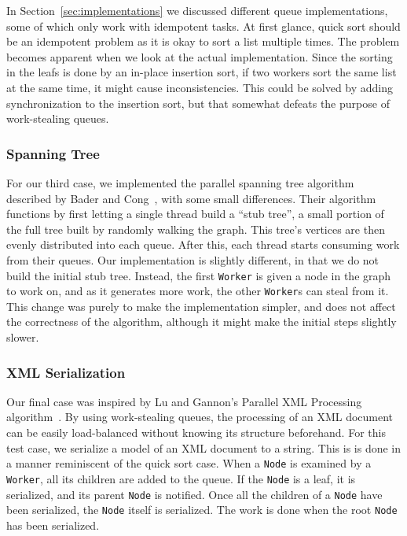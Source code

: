 In Section~\ref{sec:implementations} we discussed different queue implementations, some of which only work with idempotent tasks. At first glance, quick sort should be an idempotent problem as it is okay to sort a list multiple times. The problem becomes apparent when we look at the actual implementation. Since the sorting in the leafs is done by an in-place insertion sort, if two workers sort the same list at the same time, it might cause inconsistencies. This could be solved by adding synchronization to the insertion sort, but that somewhat defeats the purpose of work-stealing queues.

\subsubsection{Spanning Tree} %
For our third case, we implemented the parallel spanning tree algorithm
described by Bader and Cong~\cite{Bader04afast}, with some small differences.
Their algorithm functions by first letting a single thread build a ``stub
tree'', a small portion of the full tree built by randomly walking the graph.
This tree's vertices are then evenly distributed into each queue. After this,
each thread starts consuming work from their queues. Our implementation is
slightly different, in that we do not build the initial stub tree. Instead, the
first \texttt{Worker} is given a node in the graph to work on, and as it
generates more work, the other \texttt{Worker}s can steal from it. This change
was purely to make the implementation simpler, and does not affect the
correctness of the algorithm, although it might make the initial steps slightly
slower.

\subsubsection{XML Serialization} %
Our final case was inspired by Lu and Gannon's Parallel XML
Processing algorithm~\cite{Lu:2007:PXP:1272457.1272462}. By using work-stealing queues,
the processing of an XML document can be easily load-balanced without knowing
its structure beforehand. For this test case, we serialize a model of an XML
document to a string. This is is done in a manner reminiscent of the quick sort
case. When a \texttt{Node} is examined by a \texttt{Worker}, all its children
are added to the queue. If the \texttt{Node} is a leaf, it is serialized, and
its parent \texttt{Node} is notified. Once all the children of a \texttt{Node}
have been serialized, the \texttt{Node} itself is serialized. The work is done
when the root \texttt{Node} has been serialized.

